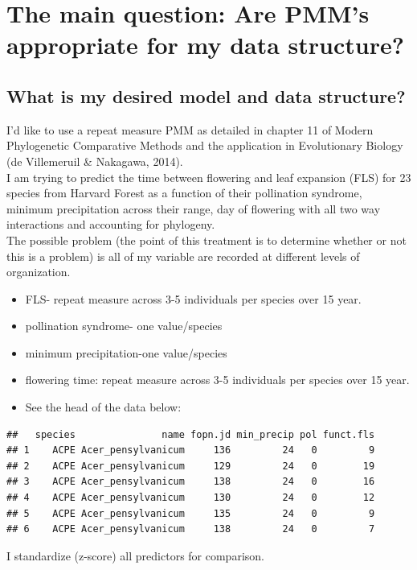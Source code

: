 \documentclass{article}\usepackage[]{graphicx}\usepackage[]{color}
\makeatletter
\newenvironment{kframe}{%
 \def\at@end@of@kframe{}%
 \ifinner\ifhmode%
  \def\at@end@of@kframe{\end{minipage}}%
  \begin{minipage}{\columnwidth}%
 \fi\fi%
 \def\FrameCommand##1{\hskip\@totalleftmargin \hskip-\fboxsep
 \colorbox{shadecolor}{##1}\hskip-\fboxsep
     \hskip-\linewidth \hskip-\@totalleftmargin \hskip\columnwidth}%
 \MakeFramed {\advance\hsize-\width
   \@totalleftmargin\z@ \linewidth\hsize
   \@setminipage}}%
 {\par\unskip\endMakeFramed%
 \at@end@of@kframe}
\newenvironment{knitrout}{}{} %
\makeatother
\begin{document}
\section{The main question: Are PMM's appropriate for my data structure?}

\subsection{What is my desired model and data structure?}
I'd like to use a repeat measure PMM as detailed in chapter 11 of Modern Phylogenetic Comparative Methods and the application in Evolutionary Biology (de Villemeruil & Nakagawa, 2014).\\

I am trying to predict the time between flowering and leaf expansion (FLS) for 23 species from Harvard Forest as a function of their pollination syndrome, minimum precipitation across their range, day of flowering with all two way interactions and accounting for phylogeny.\\

The possible problem (the point of this treatment is to determine whether or not this is a problem) is all of my variable are recorded at different levels of organization.

\begin{itemize}
\item FLS- repeat measure across 3-5 individuals per species over 15 year.\\
\item pollination syndrome- one value/species\\
\item minimum precipitation-one value/species\\
\item flowering time: repeat measure across 3-5 individuals per species over 15 year.\\
\item See the head of the data below:\\
\end{itemize}
\begin{knitrout}
\color{fgcolor}\begin{kframe}
\begin{verbatim}
##   species               name fopn.jd min_precip pol funct.fls
## 1    ACPE Acer_pensylvanicum     136         24   0         9
## 2    ACPE Acer_pensylvanicum     129         24   0        19
## 3    ACPE Acer_pensylvanicum     138         24   0        16
## 4    ACPE Acer_pensylvanicum     130         24   0        12
## 5    ACPE Acer_pensylvanicum     135         24   0         9
## 6    ACPE Acer_pensylvanicum     138         24   0         7
\end{verbatim}
\end{kframe}
\end{knitrout}
I standardize (z-score) all predictors for comparison.\\
\end{document}
